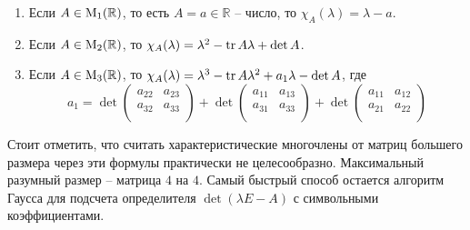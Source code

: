 \begin{enumerate}
\item Если $A\in\operatorname{M}_{1}(\mathbb R)$, то есть $A = a\in\mathbb R$ -- число, то $\chi_A(\lambda) = \lambda - a$.

\item Если $A\in\operatorname{M}_{2}(\mathbb R)$, то $\chi_A(\lambda) = \lambda^2 - \operatorname{tr} A \lambda + \det A$.

\item Если $A\in\operatorname{M}_{3}(\mathbb R)$, то $\chi_A(\lambda) = \lambda^3 - \operatorname{tr} A \lambda^2 + a_1 \lambda - \det A$, где
\[
a_1 = 
\det
\begin{pmatrix}
{a_{22}}&{a_{23}}\\
{a_{32}}&{a_{33}}\\
\end{pmatrix}
+
\det
\begin{pmatrix}
{a_{11}}&{a_{13}}\\
{a_{31}}&{a_{33}}\\
\end{pmatrix}
+
\det
\begin{pmatrix}
{a_{11}}&{a_{12}}\\
{a_{21}}&{a_{22}}\\
\end{pmatrix}
\]
\end{enumerate}

Стоит отметить, что считать характеристические многочлены от матриц большего размера через эти формулы практически не целесообразно.
Максимальный разумный размер -- матрица $4$ на $4$.
Самый быстрый способ остается алгоритм Гаусса для подсчета определителя $\det(\lambda E - A)$ с символьными коэффициентами.



